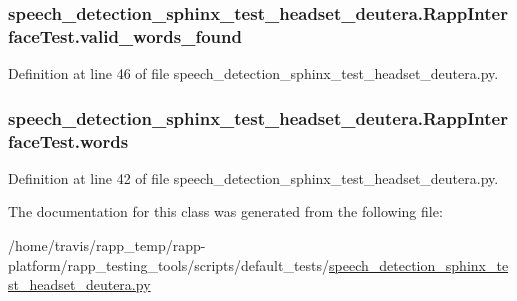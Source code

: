 \hypertarget{classspeech__detection__sphinx__test__headset__deutera_1_1RappInterfaceTest_a1c088592f7ee524c21da75f82e4b2aa7}{
\subsubsection[{valid\-\_\-words\-\_\-found}]{\setlength{\rightskip}{0pt plus 5cm}speech\-\_\-detection\-\_\-sphinx\-\_\-test\-\_\-headset\-\_\-deutera.\-Rapp\-Interface\-Test.\-valid\-\_\-words\-\_\-found}}\label{classspeech__detection__sphinx__test__headset__deutera_1_1RappInterfaceTest_a1c088592f7ee524c21da75f82e4b2aa7}


Definition at line 46 of file speech\-\_\-detection\-\_\-sphinx\-\_\-test\-\_\-headset\-\_\-deutera.\-py.

\hypertarget{classspeech__detection__sphinx__test__headset__deutera_1_1RappInterfaceTest_aac5ddc4e5fdd85dc48e7f0c033dbdba6}{
\subsubsection[{words}]{\setlength{\rightskip}{0pt plus 5cm}speech\-\_\-detection\-\_\-sphinx\-\_\-test\-\_\-headset\-\_\-deutera.\-Rapp\-Interface\-Test.\-words}}\label{classspeech__detection__sphinx__test__headset__deutera_1_1RappInterfaceTest_aac5ddc4e5fdd85dc48e7f0c033dbdba6}


Definition at line 42 of file speech\-\_\-detection\-\_\-sphinx\-\_\-test\-\_\-headset\-\_\-deutera.\-py.



The documentation for this class was generated from the following file\-:\begin{DoxyCompactItemize}
\item 
/home/travis/rapp\-\_\-temp/rapp-\/platform/rapp\-\_\-testing\-\_\-tools/scripts/default\-\_\-tests/\hyperlink{speech__detection__sphinx__test__headset__deutera_8py}{speech\-\_\-detection\-\_\-sphinx\-\_\-test\-\_\-headset\-\_\-deutera.\-py}\end{DoxyCompactItemize}
